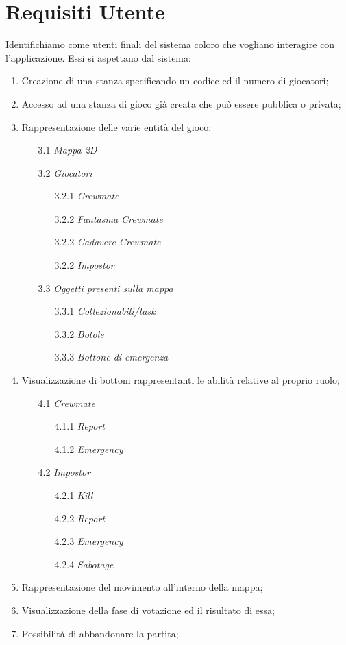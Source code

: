 \section{Requisiti Utente}
Identifichiamo come utenti finali del sistema coloro che vogliano interagire con l’applicazione. Essi si aspettano dal sistema:
\begin{enumerate}
\item Creazione di una stanza specificando un codice ed il numero di giocatori;
\item Accesso ad una stanza di gioco gi\`a creata che pu\`o essere pubblica o privata;
\item Rappresentazione delle varie entit\`a del gioco:
\begin{enumerate}
\item[3.1] \textit{Mappa 2D}
\item[3.2] \textit{Giocatori}
\begin{enumerate}
\item[3.2.1] \textit{Crewmate}
\item[3.2.2] \textit{Fantasma Crewmate} 
\item[3.2.2] \textit{Cadavere Crewmate} 
\item[3.2.2] \textit{Impostor} 
\end{enumerate}
\item[3.3] \textit{Oggetti presenti sulla mappa} 
\begin{enumerate}
\item[3.3.1] \textit{Collezionabili/task}
\item[3.3.2] \textit{Botole}
\item[3.3.3] \textit{Bottone di emergenza}
\end{enumerate}
\end{enumerate}
\item Visualizzazione di bottoni rappresentanti le abilit\`a relative al proprio ruolo;
\begin{enumerate}
\item[4.1] \textit{Crewmate} 
\begin{enumerate}
\item[4.1.1] \textit{Report} 
\item[4.1.2] \textit{Emergency} 
\end{enumerate}
\item[4.2] \textit{Impostor}
\begin{enumerate}
\item[4.2.1] \textit{Kill}
\item[4.2.2] \textit{Report} 
\item[4.2.3] \textit{Emergency} 
\item[4.2.4] \textit{Sabotage}
\end{enumerate}
\end{enumerate}
\item Rappresentazione del movimento all'interno della mappa;
\item Visualizzazione della fase di votazione ed il risultato di essa;
\item Possibilit\`a di abbandonare la partita;
\end{enumerate}

